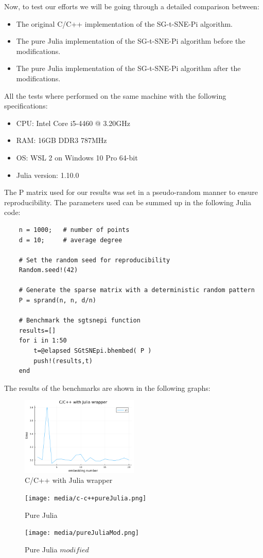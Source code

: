 Now, to test our efforts we will be going through a detailed comparison between:
\begin{itemize}
    \item The original C/C++ implementation of the SG-t-SNE-Pi algorithm.
    \item The pure Julia implementation of the SG-t-SNE-Pi algorithm before the modifications.
    \item The pure Julia implementation of the SG-t-SNE-Pi algorithm after the modifications.
\end{itemize}
All the tests where performed on the same machine with the following specifications:
\begin{itemize}
    \item CPU: Intel Core i5-4460 @ 3.20GHz
    \item RAM: 16GB DDR3 787MHz
    \item OS: WSL 2 on Windows 10 Pro 64-bit
    \item Julia version: 1.10.0
\end{itemize}
The P matrix used for our results was set in a pseudo-random manner to ensure reproducibility. The parameters
used can be summed up in the following Julia code:
\begin{verbatim} 
    n = 1000;   # number of points
    d = 10;     # average degree
    
    # Set the random seed for reproducibility
    Random.seed!(42)
    
    # Generate the sparse matrix with a deterministic random pattern
    P = sprand(n, n, d/n)

    # Benchmark the sgtsnepi function
    results=[]
    for i in 1:50
        t=@elapsed SGtSNEpi.bhembed( P )
        push!(results,t)
    end
\end{verbatim}
The results of the benchmarks are shown in the following graphs:
\begin{figure}[H]
    \includegraphics[width=0.5\textwidth]{media/c-c++plot.png}
    \caption{C/C++ with Julia wrapper}
\end{figure}
\begin{figure}[H]
    \texttt{[image: media/c-c++pureJulia.png]}
    \caption{Pure Julia }
\end{figure}
\begin{figure}[H]
    \texttt{[image: media/pureJuliaMod.png]}
    \caption{Pure Julia \(modified\)}
\end{figure}
